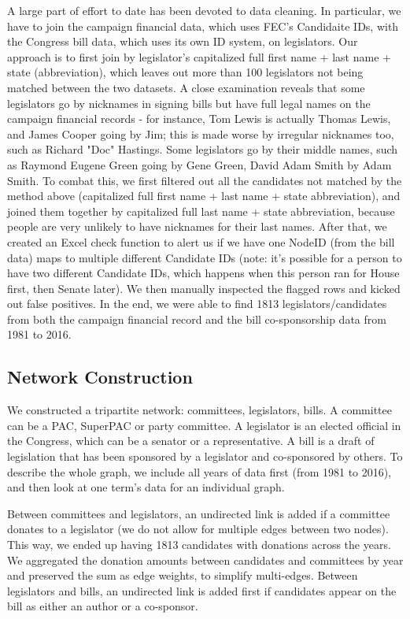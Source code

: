 \documentclass[12pt,twocolumn]{article}
\begin{document}
A large part of effort to date has been devoted to data cleaning. In particular, we have to join the campaign financial data, which uses FEC's Candidaite IDs, with the Congress bill data, which uses its own ID system, on legislators. Our approach is to first join by legislator's capitalized full first name + last name + state (abbreviation), which leaves out more than 100 legislators not being matched between the two datasets. A close examination reveals that some legislators go by nicknames in signing bills but have full legal names on the campaign financial records - for instance, Tom Lewis is actually Thomas Lewis, and James Cooper going by Jim; this is made worse by irregular nicknames too, such as Richard "Doc" Hastings. Some legislators go by their middle names, such as Raymond Eugene Green going by Gene Green, David Adam Smith by Adam Smith. To combat this, we first filtered out all the candidates not matched by the method above (capitalized full first name + last name + state abbreviation), and joined them together by capitalized full last name + state abbreviation, because people are very unlikely to have nicknames for their last names. After that, we created an Excel check function to alert us if we have one NodeID (from the bill data) maps to multiple different Candidate IDs (note: it's possible for a person to have two different Candidate IDs, which happens when this person ran for House first, then Senate later). We then manually inspected the flagged rows and kicked out false positives. In the end, we were able to find 1813 legislators/candidates from both the campaign financial record and the bill co-sponsorship data from 1981 to 2016. 

\subsection{Network Construction}
We constructed a tripartite network: committees, legislators, bills.  A committee can be a PAC, SuperPAC or party committee.  A legislator is an elected official in the Congress, which can be a senator or a representative. A bill is a draft of legislation that has been sponsored by a legislator and co-sponsored by others. To describe the whole graph, we include all years of data first (from 1981 to 2016), and then look at one term's data for an individual graph. 

Between committees and legislators, an undirected link is added if a committee donates to a legislator (we do not allow for multiple edges between two nodes). This way, we ended up having 1813 candidates with donations across the years. We aggregated the donation amounts between candidates and committees by year and preserved the sum as edge weights, to simplify multi-edges.  Between legislators and bills, an undirected link is added first if candidates appear on the bill as either an author or a co-sponsor. 
\end{document}
